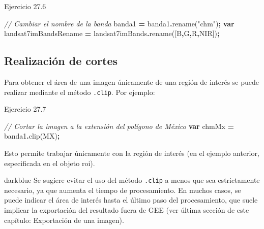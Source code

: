 \documentclass[
  12pt,
  letterpaper,
  twoside]{book}
\newenvironment{Shaded}{\begin{snugshade}}{\end{snugshade}}
\newcommand{\CommentTok}[1]{\textcolor[rgb]{0.56,0.35,0.01}{\textit{#1}}}
\newcommand{\FunctionTok}[1]{\textcolor[rgb]{0.00,0.00,0.00}{#1}}
\newcommand{\KeywordTok}[1]{\textcolor[rgb]{0.13,0.29,0.53}{\textbf{#1}}}
\newcommand{\NormalTok}[1]{#1}
\newcommand{\OperatorTok}[1]{\textcolor[rgb]{0.81,0.36,0.00}{\textbf{#1}}}
\newcommand{\StringTok}[1]{\textcolor[rgb]{0.31,0.60,0.02}{#1}}
\begin{document}
Ejercicio 27.6

\begin{Shaded}
\begin{Highlighting}[]
\CommentTok{// Cambiar el nombre de la banda }
\NormalTok{banda1 }\OperatorTok{=}\NormalTok{ banda1}\OperatorTok{.}\FunctionTok{rename}\NormalTok{(}\StringTok{"chm"}\NormalTok{)}\OperatorTok{;}
\KeywordTok{var}\NormalTok{ landsat7imBandsRename }\OperatorTok{=}\NormalTok{ landsat7imBands}\OperatorTok{.}\FunctionTok{rename}\NormalTok{([}\StringTok{\textquotesingle{}B\textquotesingle{}}\OperatorTok{,}\StringTok{\textquotesingle{}G\textquotesingle{}}\OperatorTok{,}\StringTok{\textquotesingle{}R\textquotesingle{}}\OperatorTok{,}\StringTok{\textquotesingle{}NIR\textquotesingle{}}\NormalTok{])}\OperatorTok{;}
\end{Highlighting}
\end{Shaded}

\hypertarget{realizaciuxf3n-de-cortes}{%
\subsection*{Realización de cortes}\label{realizaciuxf3n-de-cortes}}

Para obtener el área de una imagen únicamente de una región de interés se puede realizar mediante el método \texttt{.clip}. Por ejemplo:

Ejercicio 27.7

\begin{Shaded}
\begin{Highlighting}[]
\CommentTok{// Cortar la imagen a la extensión del polígono de México}
\KeywordTok{var}\NormalTok{ chmMx }\OperatorTok{=}\NormalTok{ banda1}\OperatorTok{.}\FunctionTok{clip}\NormalTok{(MX)}\OperatorTok{;}
\end{Highlighting}
\end{Shaded}

Esto permite trabajar únicamente con la región de interés (en el ejemplo anterior, especificada en el objeto roi).

\begin{bluebox2}

\begin{awesomeblock}{5pt}{\faLightbulb}{darkblue}
Se sugiere evitar el uso del método \texttt{.clip} a menos que sea estrictamente necesario, ya que aumenta el tiempo de procesamiento. En muchos casos, se puede indicar el área de interés hasta el último paso del procesamiento, que suele implicar la exportación del resultado fuera de GEE (ver última sección de este capítulo: Exportación de una imagen).

\end{awesomeblock}

\end{bluebox2}
\end{document}
